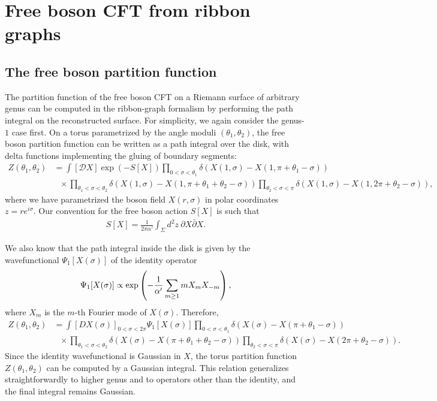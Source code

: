 \documentclass[12pt]{article}
\def\ie{\begin{equation}\begin{aligned}}
\def\fe{\end{aligned}\end{equation}}
\numberwithin{equation}{section}
\begin{document}
\section{Free boson CFT from ribbon graphs}

\label{bosonsection}

\subsection{The free boson partition function}

The partition function of the free boson CFT on a Riemann surface of arbitrary genus can be computed in the ribbon-graph formalism by performing the path integral on the reconstructed surface. For simplicity, we again consider the genus-$1$ case first. On a torus parametrized by the angle moduli $(\theta_1, \theta_2)$, the free boson partition function can be written as a path integral over the disk, with delta functions implementing the gluing of boundary segments:
\ie
Z(\theta_1, \theta_2)&=\int [\mathcal{D}X] \exp(-S[X]) \prod_{0<\sigma<\theta_1} \delta(X(1,\sigma)-X(1,\pi+\theta_1-\sigma))
\\
&~~~\times \prod_{\theta_1<\sigma< \theta_2} \delta(X(1,\sigma)-X(1,\pi+\theta_1+\theta_2 - \sigma))  \prod_{\theta_2<\sigma< \pi} \delta(X(1,\sigma)-X(1,2\pi+\theta_2 - \sigma)),
\fe
where we have parametrized the boson field $X(r,\sigma)$ in polar coordinates $z=re^{i\sigma}$. Our convention for the free boson action $S[X]$ is such that
\ie
S[X] = \frac{1}{2\pi \alpha'} \int_\Sigma d^2z~ \partial X \bar{\partial} X.
\fe

We also know that the path integral inside the disk is given by the wavefunctional $\Psi_1[X(\sigma)]$ of the identity operator
\ie\label{psionefx}
\Psi_1[X(\sigma)] \propto \exp\left( - {1\over \alpha'}\sum_{m\geq 1} m X_m X_{-m} \right),
\fe
where $X_m$ is the $m$-th Fourier mode of $X(\sigma)$. Therefore,
\ie\label{zthetas}
Z(\theta_1, \theta_2) &= \int [DX(\sigma)]_{0<\sigma<2\pi} \Psi_1[X(\sigma)] \prod_{0<\sigma<\theta_1} \delta(X(\sigma)-X(\pi+\theta_1-\sigma))
\\
&~~~\times \prod_{\theta_1<\sigma< \theta_2} \delta(X(\sigma)-X(\pi+\theta_1+\theta_2 - \sigma))  \prod_{\theta_2<\sigma< \pi} \delta(X(\sigma)-X(2\pi+\theta_2 - \sigma)).
\fe
Since the identity wavefunctional is Gaussian in $X$, the torus partition function $Z(\theta_1, \theta_2)$ can be computed by a Gaussian integral. This relation generalizes straightforwardly to higher genus and to operators other than the identity, and the final integral remains Gaussian. 
\end{document}
